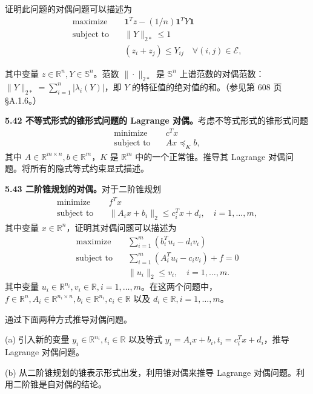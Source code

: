 \documentclass[UTF8,12pt,a4paper,fontset=fandol]{ctexart}
\begin{document}
证明此问题的对偶问题可以描述为
\[
\begin{aligned}
\text{maximize}\quad & \mathbf{1}^Tz-(1/n)\mathbf{1}^TY\mathbf{1}\\
\text{subject to}\quad & \|Y\|_{2\ast}\leq 1\\
& (z_i+z_j)\leq Y_{ij}\quad \forall (i,j)\in\mathcal{E},
\end{aligned}
\]

其中变量 $z\in\mathbb{R}^n, Y\in\mathbb{S}^n$。范数 $\|\cdot\|_{2\ast}$ 是 $\mathbb{S}^n$ 上谱范数的对偶范数：$\|Y\|_{2\ast}=\sum_{i=1}^n|\lambda_i(Y)|$，即 $Y$ 的特征值的绝对值的和。（参见第 608 页 §A.1.6。）

\noindent\textbf{5.42 不等式形式的锥形式问题的 Lagrange 对偶。}\quad 考虑不等式形式的锥形式问题
\[
\begin{aligned}
\text{minimize}\quad & c^Tx\\
\text{subject to}\quad & Ax\preceq_K b,
\end{aligned}
\]
其中 $A\in\mathbb{R}^{m\times n}, b\in\mathbb{R}^m$，$K$ 是 $\mathbb{R}^m$ 中的一个正常锥。推导其 Lagrange 对偶问题。将所有的隐式等式约束显式描述。

\noindent\textbf{5.43 二阶锥规划的对偶。}\quad 对于二阶锥规划
\[
\begin{aligned}
\text{minimize}\quad & f^Tx\\
\text{subject to}\quad & \|A_ix+b_i\|_2\leq c_i^Tx+d_i,\quad i=1,\ldots,m,
\end{aligned}
\]
其中变量 $x\in\mathbb{R}^n$，证明其对偶问题可以描述为
\[
\begin{aligned}
\text{maximize}\quad & \sum_{i=1}^m(b_i^Tu_i-d_iv_i)\\
\text{subject to}\quad & \sum_{i=1}^m(A_i^Tu_i-c_iv_i)+f=0\\
& \|u_i\|_2\leq v_i,\quad i=1,\ldots,m.
\end{aligned}
\]
其中变量 $u_i\in\mathbb{R}^{n_i}, v_i\in\mathbb{R}, i=1,\ldots,m$。在这两个问题中，$f\in\mathbb{R}^n, A_i\in\mathbb{R}^{n_i\times n}, b_i\in\mathbb{R}^{n_i}, c_i\in\mathbb{R}$ 以及 $d_i\in\mathbb{R}, i=1,\ldots,m$。

通过下面两种方式推导对偶问题。

(a) 引入新的变量 $y_i\in\mathbb{R}^{n_i}, t_i\in\mathbb{R}$ 以及等式 $y_i=A_ix+b_i, t_i=c_i^Tx+d_i$，推导 Lagrange 对偶问题。

(b) 从二阶锥规划的锥表示形式出发，利用锥对偶来推导 Lagrange 对偶问题。利用二阶锥是自对偶的结论。
\end{document}

